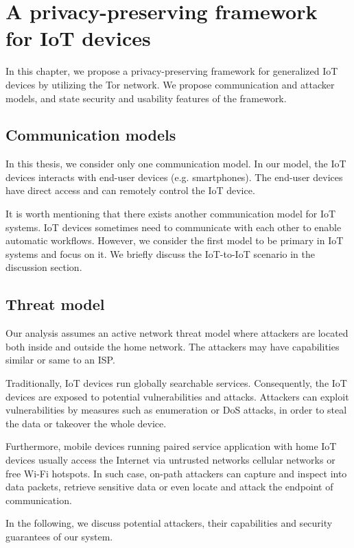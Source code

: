 \chapter{A privacy-preserving framework for IoT devices}

In this chapter, we propose a privacy-preserving framework for generalized IoT devices by utilizing the Tor network. We propose communication and attacker models, and state security and usability features of the framework.

\section{Communication models}

In this thesis, we consider only one communication model. In our model, the IoT devices interacts with end-user devices (e.g. smartphones). The end-user devices have direct access and can remotely control the IoT device. 

It is worth mentioning that there exists another communication model for IoT systems. IoT devices sometimes need to communicate with each other to enable automatic workflows. However, we consider the first model to be primary in IoT systems and focus on it. We briefly discuss the IoT-to-IoT scenario in the discussion section. 

\section{Threat model}

Our analysis assumes an active network threat model where attackers are located both inside and outside the home network. The attackers may have capabilities similar or same to an ISP.

Traditionally, IoT devices run globally searchable services\cite{antonakakis2017understanding}. Consequently, the IoT devices are exposed to potential vulnerabilities and attacks. Attackers can exploit vulnerabilities by measures such as enumeration or DoS attacks, in order to steal the data or takeover the whole device.

Furthermore, mobile devices running paired service application with home IoT devices usually access the Internet via untrusted networks cellular networks or free Wi-Fi hotspots. In such case, on-path attackers can capture and inspect into data packets, retrieve sensitive data or even locate and attack the endpoint of communication. 

In the following, we discuss potential attackers, their capabilities and security guarantees of our system. 
